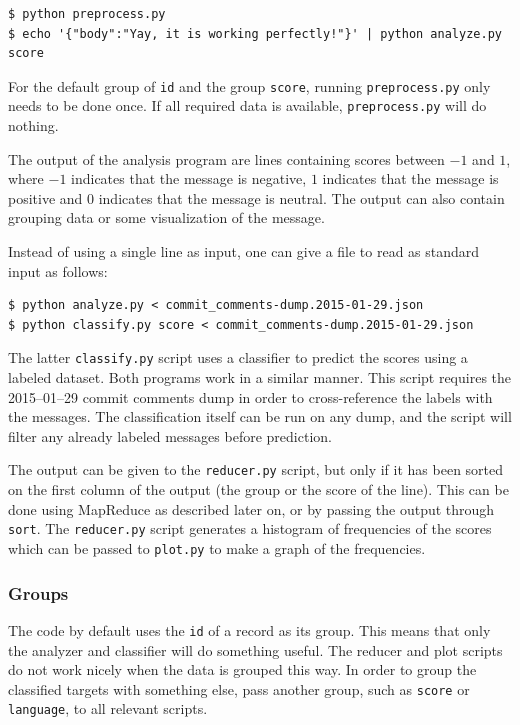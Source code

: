 \documentclass{article}
\begin{document}
\begin{verbatim}
$ python preprocess.py
$ echo '{"body":"Yay, it is working perfectly!"}' | python analyze.py score
\end{verbatim}

For the default group of \texttt{id} and the group \texttt{score}, running
\texttt{preprocess.py} only needs to be done once. If all required data is
available, \texttt{preprocess.py} will do nothing.

The output of the analysis program are lines containing scores between $-1$ and 
$1$, where $-1$ indicates that the message is negative, $1$ indicates that the 
message is positive and $0$ indicates that the message is neutral. The output 
can also contain grouping data or some visualization of the message.

Instead of using a single line as input, one can give a file to read as standard
input as follows:

\begin{verbatim}
$ python analyze.py < commit_comments-dump.2015-01-29.json
$ python classify.py score < commit_comments-dump.2015-01-29.json
\end{verbatim}

The latter \texttt{classify.py} script uses a classifier to predict the scores 
using a labeled dataset. Both programs work in a similar manner. This script 
requires the 2015--01--29 commit comments dump in order to 
cross-reference the labels with the messages. The classification itself can be 
run on any dump, and the script will filter any already labeled messages before 
prediction.

The output can be given to the \texttt{reducer.py} script, but only if it has 
been sorted on the first column of the output (the group or the score of the 
line). This can be done using MapReduce as described later on, or by passing 
the output through \texttt{sort}. The \texttt{reducer.py} script generates 
a histogram of frequencies of the scores which can be passed to 
\texttt{plot.py} to make a graph of the frequencies.

\subsubsection{Groups}\label{app:groups}
The code by default uses the \texttt{id} of a record as its group. This means 
that only the analyzer and classifier will do something useful. The reducer and 
plot scripts do not work nicely when the data is grouped this way. In order to 
group the classified targets with something else, pass another group, such as 
\texttt{score} or \texttt{language}, to all relevant scripts.
\end{document}
